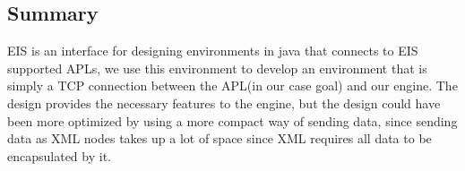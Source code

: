 \subsection*{Summary}

EIS is an interface for designing environments in java that connects
to EIS supported APLs, we use this environment to develop an environment
that is simply a TCP connection between the APL(in our case goal)
and our engine. The design provides the necessary features to the
engine, but the design could have been more optimized by using a more
compact way of sending data, since sending data as XML nodes takes
up a lot of space since XML requires all data to be encapsulated by
it.

